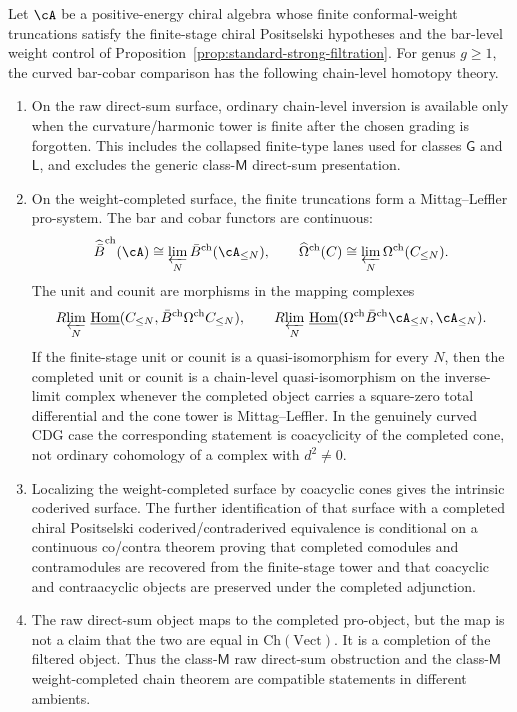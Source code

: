 \begin{theorem}
\label{thm:curved-chain-homotopy-trichotomy}
Let $\cA$ be a positive-energy chiral algebra whose finite
conformal-weight truncations satisfy the finite-stage chiral
Positselski hypotheses and the bar-level weight control of
Proposition~\ref{prop:standard-strong-filtration}. For genus
$g\geq 1$, the curved bar-cobar comparison has the following
chain-level homotopy theory.
\begin{enumerate}[label=\textup{(\roman*)}]
\item On the raw direct-sum surface, ordinary chain-level inversion is
available only when the curvature/harmonic tower is finite after the
chosen grading is forgotten. This includes the collapsed finite-type
lanes used for classes $\mathsf{G}$ and $\mathsf{L}$, and excludes the
generic class-$\mathsf{M}$ direct-sum presentation.
\item On the weight-completed surface, the finite truncations form a
Mittag--Leffler pro-system. The bar and cobar functors are continuous:
\[
\widehat{\bar B}^{\mathrm{ch}}(\cA)
\cong \varprojlim_N\bar B^{\mathrm{ch}}(\cA_{\leq N}),
\qquad
\widehat{\Omega}^{\mathrm{ch}}(C)
\cong \varprojlim_N\Omega^{\mathrm{ch}}(C_{\leq N}).
\]
The unit and counit are morphisms in the mapping complexes
\[
R\!\varprojlim_N\,
\underline{\mathrm{Hom}}(C_{\leq N},
\bar B^{\mathrm{ch}}\Omega^{\mathrm{ch}}C_{\leq N}),
\qquad
R\!\varprojlim_N\,
\underline{\mathrm{Hom}}(\Omega^{\mathrm{ch}}\bar B^{\mathrm{ch}}
\cA_{\leq N},\cA_{\leq N}).
\]
If the finite-stage unit or counit is a quasi-isomorphism for every
$N$, then the completed unit or counit is a chain-level
quasi-isomorphism on the inverse-limit complex whenever the completed
object carries a square-zero total differential and the cone tower is
Mittag--Leffler. In the genuinely curved CDG case the corresponding
statement is coacyclicity of the completed cone, not ordinary
cohomology of a complex with $d^2\neq 0$.
\item Localizing the weight-completed surface by coacyclic cones gives
the intrinsic coderived surface. The further identification of that
surface with a completed chiral Positselski
coderived/contraderived equivalence is conditional on a continuous
co/contra theorem proving that completed comodules and contramodules
are recovered from the finite-stage tower and that coacyclic and
contraacyclic objects are preserved under the completed adjunction.
\item The raw direct-sum object maps to the completed pro-object, but
the map is not a claim that the two are equal in
$\mathrm{Ch}(\mathrm{Vect})$. It is a completion of the filtered
object. Thus the class-$\mathsf{M}$ raw direct-sum obstruction and the
class-$\mathsf{M}$ weight-completed chain theorem are compatible
statements in different ambients.
\end{enumerate}
\end{theorem}

